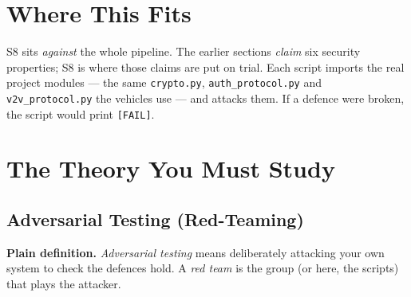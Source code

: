 \documentclass[11pt,a4paper]{report}
\begin{document}
\section{Where This Fits}

S8 sits \emph{against} the whole pipeline. The earlier sections \emph{claim}
six security properties; S8 is where those claims are put on trial. Each script
imports the real project modules --- the same \texttt{crypto.py},
\texttt{auth\_protocol.py} and \texttt{v2v\_protocol.py} the vehicles use --- and
attacks them. If a defence were broken, the script would print \texttt{[FAIL]}.

\begin{center}
\end{center}

\section{The Theory You Must Study}

\subsection{Adversarial Testing (Red-Teaming)}
\textbf{Plain definition.} \emph{Adversarial testing} means deliberately
attacking your own system to check the defences hold. A \emph{red team} is the
group (or here, the scripts) that plays the attacker.
\end{document}
